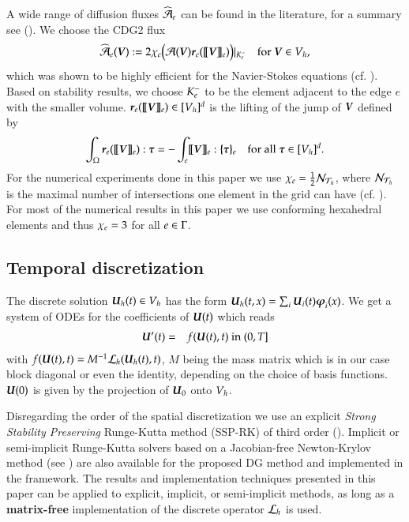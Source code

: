 A wide range of diffusion fluxes $\widehat{\mathcal{A}}_{e}$ can be found in the
literature, for a summary see (\cite{uni:02}).
We choose the CDG2 flux
\begin{eqnarray}
\widehat{\mathcal{A}}_{e}(\boldsymbol{V}) := 2\chi_e \big(\mathcal{A}(\boldsymbol{V}){{\boldsymbol{r}}_e}([ \! [ {\boldsymbol{V}} ] \! ]_{e})\big)|_{{K^-_e}}
\quad\mbox{for } \boldsymbol{V}\in V_h,
\end{eqnarray}
which was shown to be highly efficient for the Navier-Stokes equations (cf. \cite{cdg2:10}). 
Based on stability results, we choose ${K^-_e}$ to be the element adjacent to the edge $e$ with the smaller
volume. ${{\boldsymbol{r}}_e}([ \! [ {\boldsymbol{V}} ] \! ]_{e})\in [V_h]^d$ is the lifting of the jump of $\boldsymbol{V}$ defined by
\begin{eqnarray}
    \int_\Omega \liftre(\vjump{\vecV}) : \taubold = -\int_e
    \vjump{\vecV} : \vaver{\taubold} \quad
    \mbox{for all}\;\taubold\in [\phispace]^d.
\end{eqnarray}
For the numerical experiments done in this paper we use $\chi_e= \frac{1}{2}\mathcal{N}_{\mathcal{T}_h}$,
where $\mathcal{N}_{\mathcal{T}_h}$ is the maximal number of intersections one element in the grid
can  have (cf. \cite{cdg2:10}). For most of the 
numerical results in this paper we use
conforming hexahedral elements and thus $\chi_e=3$ for all $e \in \Gamma$.

\subsection{Temporal discretization}
\label{TimeDisc}

The discrete solution $\boldsymbol{U}_h(t) \in V_h$ 
has the form $\boldsymbol{U}_h(t,x) = \sum_i \boldsymbol{U}_i(t)\boldsymbol{\varphi}_i(x)$.
We get a system of ODEs for the coefficients of $\boldsymbol{U}(t)$ which reads 
\begin{eqnarray}
  \label{eqn:ode}
  \boldsymbol{U}'(t) &=& f(\boldsymbol{U}(t),t)  \mbox{ in } (0,T]
\end{eqnarray}
with $f(\boldsymbol{U}(t),t) = M^{-1}\mathcal{L}_h(\boldsymbol{U}_h(t),t)$, $M$ being the mass matrix which is in
our case block diagonal or even the identity, depending on the choice of basis
functions. $\boldsymbol{U}(0)$ is given by the projection of $\boldsymbol{U}_0$ onto $V_h$.

Disregarding the order of the spatial discretization
we use an explicit \textit{Strong Stability
Preserving} Runge-Kutta method (SSP-RK) of third order (\cite{shu:01}). 
Implicit or semi-implicit Runge-Kutta solvers based on a Jacobian-free Newton-Krylov
method (see \cite{knoll:04}) are also available for the proposed DG method 
and implemented in the \dunefem framework.
The results and implementation techniques 
presented in this paper can be applied to explicit, 
implicit, or semi-implicit methods, as long as a 
\textbf{matrix-free} implementation of the discrete operator 
$\mathcal{L}_h$ is used.


